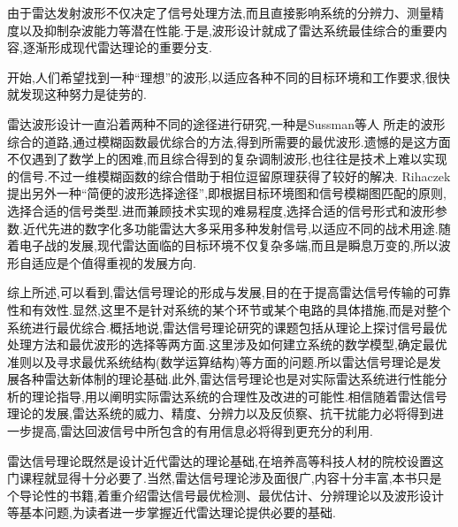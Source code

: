 由于雷达发射波形不仅决定了信号处理方法,而且直接影响系统的分辨力、测量精度以及抑制杂波能力等潜在性能.于是,波形设计就成了雷达系统最佳综合的重要内容,逐渐形成现代雷达理论的重要分支.

开始,人们希望找到一种``理想''的波形,以适应各种不同的目标环境和工作要求,很快就发现这种努力是徒劳的.

雷达波形设计一直沿着两种不同的途径进行研究,一种是Sussman等人 所走的波形综合的道路,通过模糊函数最优综合的方法,得到所需要的最优波形.遗憾的是这方面不仅遇到了数学上的困难,而且综合得到的复杂调制波形,也往往是技术上难以实现的信号.不过一维模糊函数的综合借助于相位逗留原理获得了较好的解决. Rihaczek 提出另外一种``简便的波形选择途径'',即根据目标环境图和信号模糊图匹配的原则,选择合适的信号类型.进而兼顾技术实现的难易程度,选择合适的信号形式和波形参数.近代先进的数字化多功能雷达大多采用多种发射信号,以适应不同的战术用途.随着电子战的发展,现代雷达面临的目标环境不仅复杂多端,而且是瞬息万变的,所以波形自适应是个值得重视的发展方向.

综上所述,可以看到,雷达信号理论的形成与发展,目的在于提高雷达信号传输的可靠性和有效性.显然,这里不是针对系统的某个环节或某个电路的具体措施,而是对整个系统进行最优综合.概括地说,雷达信号理论研究的课题包括从理论上探讨信号最优处理方法和最优波形的选择等两方面.这里涉及如何建立系统的数学模型,确定最优准则以及寻求最优系统结构(数学运算结构)等方面的问题.所以雷达信号理论是发展各种雷达新体制的理论基础.此外,雷达信号理论也是对实际雷达系统进行性能分析的理论指导,用以阐明实际雷达系统的合理性及改进的可能性.相信随着雷达信号理论的发展,雷达系统的威力、精度、分辨力以及反侦察、抗干扰能力必将得到进一步提高,雷达回波信号中所包含的有用信息必将得到更充分的利用.

雷达信号理论既然是设计近代雷达的理论基础,在培养高等科技人材的院校设置这门课程就显得十分必要了.当然,雷达信号理论涉及面很广,内容十分丰富,本书只是个导论性的书籍,着重介绍雷达信号最优检测、最优估计、分辨理论以及波形设计等基本问题,为读者进一步掌握近代雷达理论提供必要的基础.


